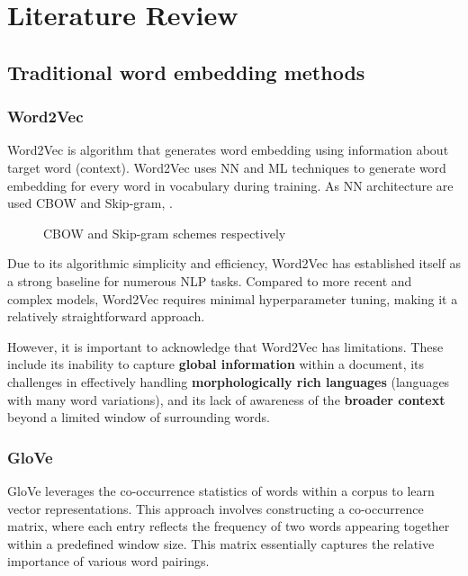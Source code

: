 
\chapter{Literature Review\label{chap:literature_review}}

\section{Traditional word embedding methods}

\subsection{Word2Vec \cite{word2vec}}
Word2Vec is algorithm that generates word embedding using information about target word (context).
Word2Vec uses \ac{NN} and \ac{ML} techniques to generate word embedding for every word in vocabulary during training.
As \ac{NN} architecture are used \ac{CBOW} and Skip-gram, .

\begin{figure}[h]
    \centering
    
    
    \caption{\ac{CBOW} and Skip-gram schemes respectively}
    \label{fig:cbow_skipgram_scheme}
\end{figure} 

Due to its algorithmic simplicity and efficiency, Word2Vec has established itself as a strong baseline for numerous \ac{NLP} tasks.
Compared to more recent and complex models, Word2Vec requires minimal hyperparameter tuning, making it a relatively straightforward approach.

However, it is important to acknowledge that Word2Vec has limitations.
These include its inability to capture \textbf{global information} within a document, its challenges in effectively handling \textbf{morphologically rich languages} (languages with many word variations), and its lack of awareness of the \textbf{broader context} beyond a limited window of surrounding words.

\subsection{\ac{GloVe} \cite{glove}}
\ac{GloVe} leverages the co-occurrence statistics of words within a corpus to learn vector representations.
This approach involves constructing a co-occurrence matrix, where each entry reflects the frequency of two words appearing together within a predefined window size.
This matrix essentially captures the relative importance of various word pairings.

